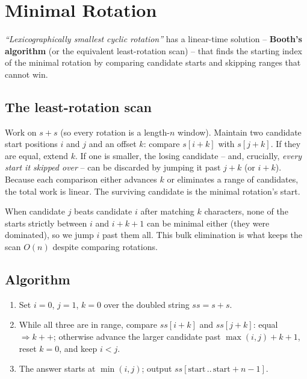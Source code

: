 \section{Minimal Rotation}
\label{sec:cses-minimal-rotation}


\begin{patternbox}
\emph{``Lexicographically smallest cyclic rotation''} has a linear-time
solution -- \textbf{Booth's algorithm} (or the equivalent least-rotation
scan) -- that finds the starting index of the minimal rotation by
comparing candidate starts and skipping ranges that cannot win.
\end{patternbox}

\subsection*{The least-rotation scan}

Work on $s+s$ (so every rotation is a length-$n$ window). Maintain two
candidate start positions $i$ and $j$ and an offset $k$: compare
$s[i+k]$ with $s[j+k]$. If they are equal, extend $k$. If one is smaller,
the losing candidate -- and, crucially, \emph{every start it skipped over}
-- can be discarded by jumping it past $j+k$ (or $i+k$). Because each
comparison either advances $k$ or eliminates a range of candidates, the
total work is linear. The surviving candidate is the minimal rotation's
start.

\begin{ideabox}
When candidate $j$ beats candidate $i$ after matching $k$ characters,
none of the starts strictly between $i$ and $i+k+1$ can be minimal either
(they were dominated), so we jump $i$ past them all. This bulk elimination
is what keeps the scan $O(n)$ despite comparing rotations.
\end{ideabox}

\subsection*{Algorithm}

\begin{enumerate}
  \item Set $i=0$, $j=1$, $k=0$ over the doubled string $ss=s+s$.
  \item While all three are in range, compare $ss[i+k]$ and $ss[j+k]$:
        equal $\Rightarrow k{+}{+}$; otherwise advance the larger
        candidate past $\max(i,j)+k+1$, reset $k=0$, and keep $i<j$.
  \item The answer starts at $\min(i,j)$; output $ss[\text{start}\,..\,
        \text{start}+n-1]$.
\end{enumerate}


